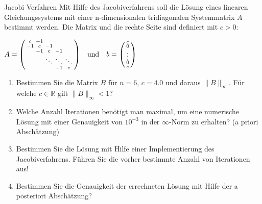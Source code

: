 \begin{example2}{Jacobi Verfahren}
Mit Hilfe des Jacobiverfahrens soll die Lösung eines linearen Gleichungssystems mit einer n-dimensionalen tridiagonalen Systemmatrix $A$ bestimmt werden. 
Die Matrix und die rechte Seite sind definiert mit $c > 0$:

$A = \begin{psmallmatrix}
c & -1 & & & \\
-1 & c & -1 & & \\
& -1 & c & -1 & \\
& & \ddots & \ddots & \ddots \\
& & & -1 & c
\end{psmallmatrix}
\quad \text{und} \quad
b = \begin{psmallmatrix}
c\\
0\\
\vdots\\
0\\
c
\end{psmallmatrix}$
\begin{enumerate}
    \item Bestimmen Sie die Matrix $B$ für $n=6$, $c=4.0$ und daraus $\|B\|_\infty$. Für welche $c \in \mathbb{R}$ gilt $\|B\|_\infty < 1$?
    
    \item Welche Anzahl Iterationen benötigt man maximal, um eine numerische Lösung mit einer Genauigkeit von $10^{-3}$ in der $\infty$-Norm zu erhalten? (a priori Abschätzung)
    
    \item Bestimmen Sie die Lösung mit Hilfe einer Implementierung des Jacobiverfahrens. Führen Sie die vorher bestimmte Anzahl von Iterationen aus!
    
    \item Bestimmen Sie die Genauigkeit der errechneten Lösung mit Hilfe der a posteriori Abschätzung?
\end{enumerate}
\end{example2}

